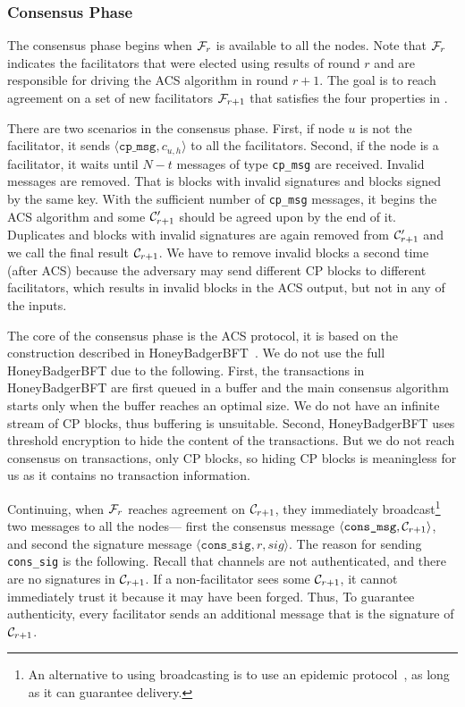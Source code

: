 \subsubsection{Consensus Phase}
\label{sec:consensus-phase}
The consensus phase begins when $\mathcal{F}_r$ is available to all the nodes.
Note that $\mathcal{F}_r$ indicates the facilitators that were elected using results of round $r$ and are responsible for driving the ACS algorithm in round $r + 1$.
The goal is to reach agreement on a set of new facilitators $\mathcal{F}_{r + 1}$ that satisfies the four properties in .

There are two scenarios in the consensus phase.
First, if node $u$ is not the facilitator, it sends $\langle \texttt{cp\_msg}, c_{u, h} \rangle$ to all the facilitators.
Second, if the node is a facilitator, it waits until $N - t$ messages of type \texttt{cp\_msg} are received.
Invalid messages are removed.
That is blocks with invalid signatures and blocks signed by the same key.
With the sufficient number of \texttt{cp\_msg} messages,
it begins the ACS algorithm and some $\mathcal{C}'_{r + 1}$ should be agreed upon by the end of it.
Duplicates and blocks with invalid signatures are again removed from $\mathcal{C}'_{r+1}$ and we call the final result $\mathcal{C}_{r+1}$.
We have to remove invalid blocks a second time (after ACS) because the adversary may send different CP blocks to different facilitators,
which results in invalid blocks in the ACS output, but not in any of the inputs.

The core of the consensus phase is the ACS protocol,
it is based on the construction described in HoneyBadgerBFT~\cite{miller2016honey}.
We do not use the full HoneyBadgerBFT due to the following.
First, the transactions in HoneyBadgerBFT are first queued in a buffer and the main consensus algorithm starts only when the buffer reaches an optimal size.
We do not have an infinite stream of CP blocks, thus buffering is unsuitable.
Second, HoneyBadgerBFT uses threshold encryption to hide the content of the transactions.
But we do not reach consensus on transactions, only CP blocks, so hiding CP blocks is meaningless for us as it contains no transaction information.

Continuing, when $\mathcal{F}_{r}$ reaches agreement on $\mathcal{C}_{r+1}$,
they immediately broadcast\footnote{An alternative to using broadcasting is to use an epidemic protocol~\cite{eugster2004epidemic}, 
as long as it can guarantee delivery.} two messages to all the nodes---
first the consensus message $\langle \texttt{cons\_msg}, \mathcal{C}_{r+1} \rangle$,
and second the signature message $\langle \texttt{cons\_sig}, r, sig \rangle$.
The reason for sending \texttt{cons\_sig} is the following.
Recall that channels are not authenticated, 
and there are no signatures in $\mathcal{C}_{r + 1}$.
If a non-facilitator sees some $\mathcal{C}_{r + 1}$, it cannot immediately trust it because it may have been forged.
Thus, To guarantee authenticity, every facilitator sends an additional message that is the signature of $\mathcal{C}_{r + 1}$.

